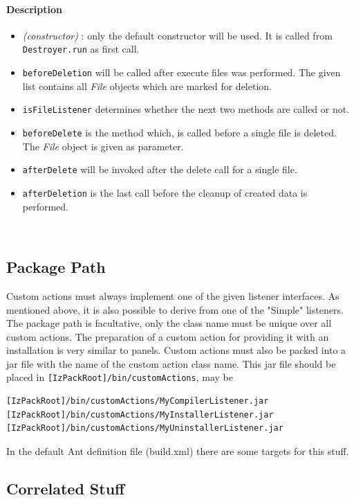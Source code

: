 \paragraph{Description}

\begin{itemize}

  \item \textit{(constructor)} : only the default constructor will
  be used. It is called from \texttt{Destroyer.run} as first call.
  \item \texttt{beforeDeletion} will be called after execute files was performed.
  The given list contains all \emph{File} objects which are marked for deletion.
  \item \texttt{isFileListener} determines whether the next two
  methods are called or not.
  \item \texttt{beforeDelete} is the method which, is called before
  a single file is deleted. The \emph{File} object is given as
  parameter.
  \item \texttt{afterDelete} will be invoked after the delete call
  for a single file.
  \item \texttt{afterDeletion} is the last call before the
  cleanup of created data is performed.
\end{itemize}\

\subsection{Package Path}
Custom actions must always implement one of the given listener
interfaces. As mentioned above, it is also possible to derive from
one of the "Simple" listeners. The package path is facultative, only the
class name must be unique over all custom actions. The preparation of a
custom action for providing it with an installation is very similar to panels.
Custom actions must also be packed into a jar file with the name
of the custom action class name. This jar file should be placed in
\texttt{[IzPackRoot]/bin/customActions}, may be
\begin{verbatim}
[IzPackRoot]/bin/customActions/MyCompilerListener.jar
[IzPackRoot]/bin/customActions/MyInstallerListener.jar
[IzPackRoot]/bin/customActions/MyUninstallerListener.jar
\end{verbatim}
In the default Ant definition file (build.xml) there are some
targets for this stuff.


\subsection{Correlated Stuff}
